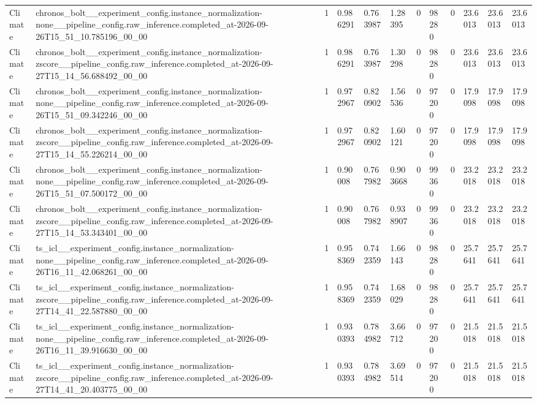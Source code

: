 \begin{tabular}{llllllllllll}
Climate & chronos\_bolt\_\_experiment\_config.instance\_normalization-none\_\_pipeline\_config.raw\_inference.completed\_at-2026-09-26T15\_51\_10.785196\_00\_00 & 1 & 0.986291 & 0.763987 & 1.28395 & 0 & 98280 & 0 & 23.6013 & 23.6013 & 23.6013 \\
Climate & chronos\_bolt\_\_experiment\_config.instance\_normalization-zscore\_\_pipeline\_config.raw\_inference.completed\_at-2026-09-27T15\_14\_56.688492\_00\_00 & 1 & 0.986291 & 0.763987 & 1.30298 & 0 & 98280 & 0 & 23.6013 & 23.6013 & 23.6013 \\
Climate & chronos\_bolt\_\_experiment\_config.instance\_normalization-none\_\_pipeline\_config.raw\_inference.completed\_at-2026-09-26T15\_51\_09.342246\_00\_00 & 1 & 0.972967 & 0.820902 & 1.56536 & 0 & 97200 & 0 & 17.9098 & 17.9098 & 17.9098 \\
Climate & chronos\_bolt\_\_experiment\_config.instance\_normalization-zscore\_\_pipeline\_config.raw\_inference.completed\_at-2026-09-27T15\_14\_55.226214\_00\_00 & 1 & 0.972967 & 0.820902 & 1.60121 & 0 & 97200 & 0 & 17.9098 & 17.9098 & 17.9098 \\
Climate & chronos\_bolt\_\_experiment\_config.instance\_normalization-none\_\_pipeline\_config.raw\_inference.completed\_at-2026-09-26T15\_51\_07.500172\_00\_00 & 1 & 0.90008 & 0.767982 & 0.903668 & 0 & 99360 & 0 & 23.2018 & 23.2018 & 23.2018 \\
Climate & chronos\_bolt\_\_experiment\_config.instance\_normalization-zscore\_\_pipeline\_config.raw\_inference.completed\_at-2026-09-27T15\_14\_53.343401\_00\_00 & 1 & 0.90008 & 0.767982 & 0.938907 & 0 & 99360 & 0 & 23.2018 & 23.2018 & 23.2018 \\
Climate & ts\_icl\_\_experiment\_config.instance\_normalization-none\_\_pipeline\_config.raw\_inference.completed\_at-2026-09-26T16\_11\_42.068261\_00\_00 & 1 & 0.958369 & 0.742359 & 1.66143 & 0 & 98280 & 0 & 25.7641 & 25.7641 & 25.7641 \\
Climate & ts\_icl\_\_experiment\_config.instance\_normalization-zscore\_\_pipeline\_config.raw\_inference.completed\_at-2026-09-27T14\_41\_22.587880\_00\_00 & 1 & 0.958369 & 0.742359 & 1.68029 & 0 & 98280 & 0 & 25.7641 & 25.7641 & 25.7641 \\
Climate & ts\_icl\_\_experiment\_config.instance\_normalization-none\_\_pipeline\_config.raw\_inference.completed\_at-2026-09-26T16\_11\_39.916630\_00\_00 & 1 & 0.930393 & 0.784982 & 3.66712 & 0 & 97200 & 0 & 21.5018 & 21.5018 & 21.5018 \\
Climate & ts\_icl\_\_experiment\_config.instance\_normalization-zscore\_\_pipeline\_config.raw\_inference.completed\_at-2026-09-27T14\_41\_20.403775\_00\_00 & 1 & 0.930393 & 0.784982 & 3.69514 & 0 & 97200 & 0 & 21.5018 & 21.5018 & 21.5018 \\

\end{tabular}
